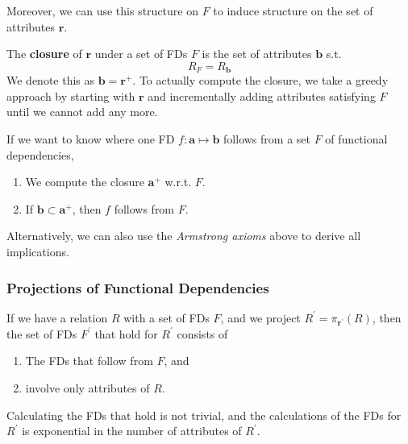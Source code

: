 \documentclass{article}
\begin{document}
      Moreover, we can use this structure on $F$ to induce structure on the set of attributes $\mathbf{r}$. 

      \begin{definition}
        The \textbf{closure} of $\mathbf{r}$ under a set of FDs $F$ is the set of attributes $\mathbf{b}$ s.t. 
        \begin{equation}
          R_F = R_\mathbf{b}
        \end{equation}
        We denote this as $\mathbf{b} = \mathbf{r}^+$. To actually compute the closure, we take a greedy approach by starting with $\mathbf{r}$ and incrementally adding attributes satisfying $F$ until we cannot add any more. 
      \end{definition}

      \begin{theorem}
        If we want to know where one FD $f: \mathbf{a} \mapsto \mathbf{b}$ follows from a set $F$ of functional dependencies, 
        \begin{enumerate}
          \item We compute the closure $\mathbf{a}^+$ w.r.t. $F$. 
          \item If $\mathbf{b} \subset \mathbf{a}^+$, then $f$ follows from $F$. 
        \end{enumerate}
        Alternatively, we can also use the \textit{Armstrong axioms} above to derive all implications. 
      \end{theorem}
    
    \subsubsection{Projections of Functional Dependencies} 

      If we have a relation $R$ with a set of FDs $F$, and we project $R^\prime = \pi_{\mathbf{r}^\prime} (R)$, then the set of FDs $F^\prime$ that hold for $R^\prime$ consists of 
      \begin{enumerate}
        \item The FDs that follow from $F$, and 
        \item involve only attributes of $R$. 
      \end{enumerate} 

      Calculating the FDs that hold is not trivial, and the calculations of the FDs for $R^\prime$ is exponential in the number of attributes of $R^\prime$. 
\end{document}
